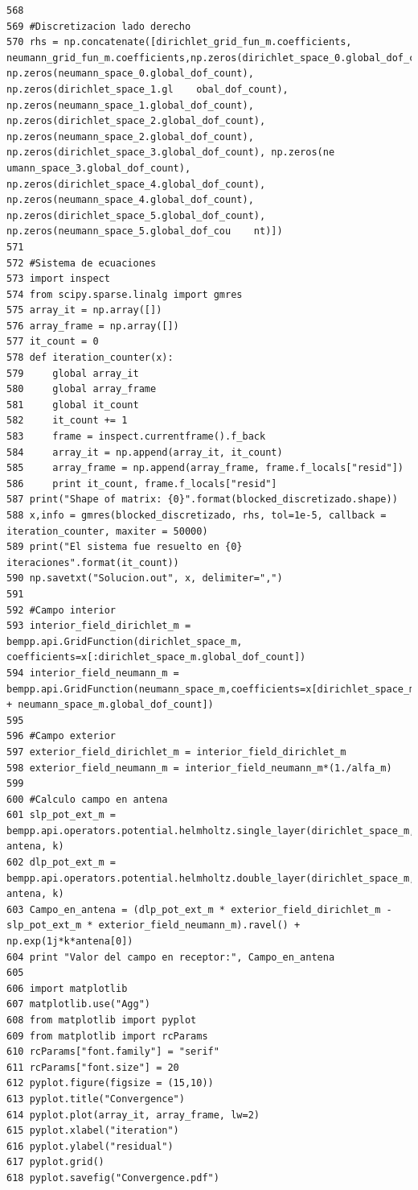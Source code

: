 \documentclass[12pt,letterpaper]{article}
\numberwithin{equation}{section}
\begin{document}
\begin{lstlisting}
568 
569 #Discretizacion lado derecho
570 rhs = np.concatenate([dirichlet_grid_fun_m.coefficients, neumann_grid_fun_m.coefficients,np.zeros(dirichlet_space_0.global_dof_count), np.zeros(neumann_space_0.global_dof_count), np.zeros(dirichlet_space_1.gl    obal_dof_count), np.zeros(neumann_space_1.global_dof_count), np.zeros(dirichlet_space_2.global_dof_count), np.zeros(neumann_space_2.global_dof_count), np.zeros(dirichlet_space_3.global_dof_count), np.zeros(ne    umann_space_3.global_dof_count), np.zeros(dirichlet_space_4.global_dof_count), np.zeros(neumann_space_4.global_dof_count), np.zeros(dirichlet_space_5.global_dof_count), np.zeros(neumann_space_5.global_dof_cou    nt)])
571 
572 #Sistema de ecuaciones
573 import inspect
574 from scipy.sparse.linalg import gmres
575 array_it = np.array([])
576 array_frame = np.array([])
577 it_count = 0
578 def iteration_counter(x):
579     global array_it
580     global array_frame
581     global it_count
582     it_count += 1
583     frame = inspect.currentframe().f_back
584     array_it = np.append(array_it, it_count)
585     array_frame = np.append(array_frame, frame.f_locals["resid"])
586     print it_count, frame.f_locals["resid"]
587 print("Shape of matrix: {0}".format(blocked_discretizado.shape))
588 x,info = gmres(blocked_discretizado, rhs, tol=1e-5, callback = iteration_counter, maxiter = 50000)
589 print("El sistema fue resuelto en {0} iteraciones".format(it_count))
590 np.savetxt("Solucion.out", x, delimiter=",")
591 
592 #Campo interior
593 interior_field_dirichlet_m = bempp.api.GridFunction(dirichlet_space_m, coefficients=x[:dirichlet_space_m.global_dof_count])
594 interior_field_neumann_m = bempp.api.GridFunction(neumann_space_m,coefficients=x[dirichlet_space_m.global_dof_count:dirichlet_space_m.global_dof_count + neumann_space_m.global_dof_count])
595 
596 #Campo exterior
597 exterior_field_dirichlet_m = interior_field_dirichlet_m
598 exterior_field_neumann_m = interior_field_neumann_m*(1./alfa_m)
599 
600 #Calculo campo en antena
601 slp_pot_ext_m = bempp.api.operators.potential.helmholtz.single_layer(dirichlet_space_m, antena, k)
602 dlp_pot_ext_m = bempp.api.operators.potential.helmholtz.double_layer(dirichlet_space_m, antena, k)
603 Campo_en_antena = (dlp_pot_ext_m * exterior_field_dirichlet_m - slp_pot_ext_m * exterior_field_neumann_m).ravel() + np.exp(1j*k*antena[0])
604 print "Valor del campo en receptor:", Campo_en_antena
605 
606 import matplotlib
607 matplotlib.use("Agg")
608 from matplotlib import pyplot
609 from matplotlib import rcParams
610 rcParams["font.family"] = "serif"
611 rcParams["font.size"] = 20
612 pyplot.figure(figsize = (15,10))
613 pyplot.title("Convergence")
614 pyplot.plot(array_it, array_frame, lw=2)
615 pyplot.xlabel("iteration")
616 pyplot.ylabel("residual")
617 pyplot.grid()
618 pyplot.savefig("Convergence.pdf")

\end{lstlisting}
\end{document}
